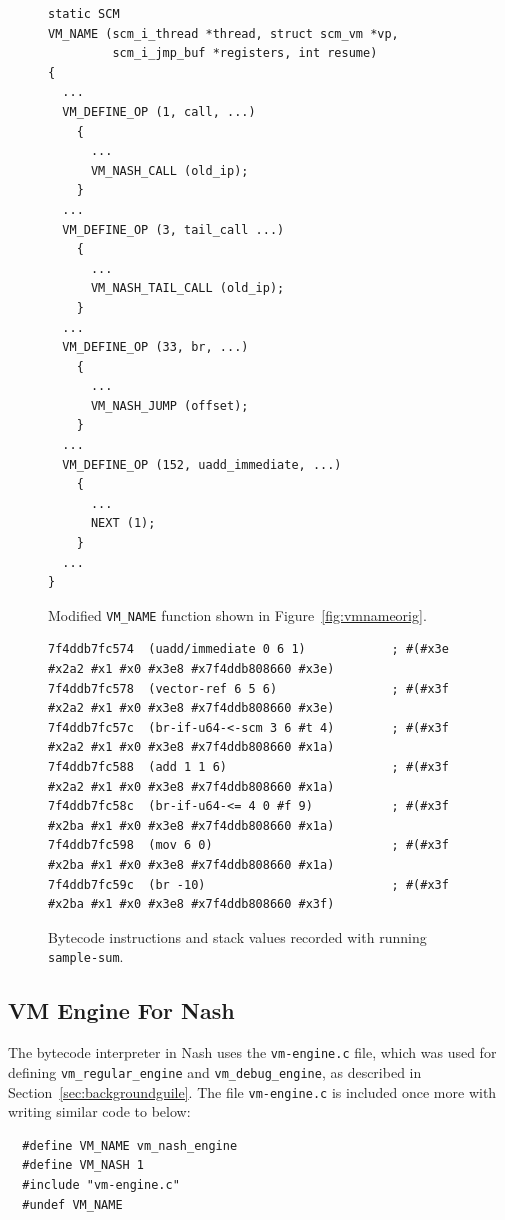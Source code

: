 \documentclass[preprint]{sigplanconf}
\begin{document}
\begin{figure}
  \centering
\begin{verbatim}
static SCM
VM_NAME (scm_i_thread *thread, struct scm_vm *vp,
         scm_i_jmp_buf *registers, int resume)
{
  ...
  VM_DEFINE_OP (1, call, ...)
    {
      ...
      VM_NASH_CALL (old_ip);
    }
  ...
  VM_DEFINE_OP (3, tail_call ...)
    {
      ...
      VM_NASH_TAIL_CALL (old_ip);
    }
  ...
  VM_DEFINE_OP (33, br, ...)
    {
      ...
      VM_NASH_JUMP (offset);
    }
  ...
  VM_DEFINE_OP (152, uadd_immediate, ...)
    {
      ...
      NEXT (1);
    }
  ...
}
\end{verbatim}
\caption{Modified \texttt{VM\_NAME} function shown in
  Figure~\hyperref[fig:vmnameorig]{\ref{fig:vmnameorig}}.}
\label{fig:vmnamenash}
\end{figure}

\begin{figure}
  \centering
\begin{verbatim}
7f4ddb7fc574  (uadd/immediate 0 6 1)            ; #(#x3e #x2a2 #x1 #x0 #x3e8 #x7f4ddb808660 #x3e)
7f4ddb7fc578  (vector-ref 6 5 6)                ; #(#x3f #x2a2 #x1 #x0 #x3e8 #x7f4ddb808660 #x3e)
7f4ddb7fc57c  (br-if-u64-<-scm 3 6 #t 4)        ; #(#x3f #x2a2 #x1 #x0 #x3e8 #x7f4ddb808660 #x1a)
7f4ddb7fc588  (add 1 1 6)                       ; #(#x3f #x2a2 #x1 #x0 #x3e8 #x7f4ddb808660 #x1a)
7f4ddb7fc58c  (br-if-u64-<= 4 0 #f 9)           ; #(#x3f #x2ba #x1 #x0 #x3e8 #x7f4ddb808660 #x1a)
7f4ddb7fc598  (mov 6 0)                         ; #(#x3f #x2ba #x1 #x0 #x3e8 #x7f4ddb808660 #x1a)
7f4ddb7fc59c  (br -10)                          ; #(#x3f #x2ba #x1 #x0 #x3e8 #x7f4ddb808660 #x3f)
\end{verbatim}
\caption{Bytecode instructions and stack values recorded with running
  \texttt{sample-sum}.}
\label{fig:trace}
\end{figure}

\subsection{VM Engine For Nash}
The bytecode interpreter in Nash uses the \texttt{vm-engine.c} file, which was
used for defining \texttt{vm\_regular\_engine} and \texttt{vm\_debug\_engine},
as described in Section~\hyperref[sec:background]{\ref{sec:backgroundguile}}.
The file \texttt{vm-engine.c} is included once more with writing similar code to
below:

\begin{verbatim}
  #define VM_NAME vm_nash_engine
  #define VM_NASH 1
  #include "vm-engine.c"
  #undef VM_NAME
\end{verbatim}
\end{document}
